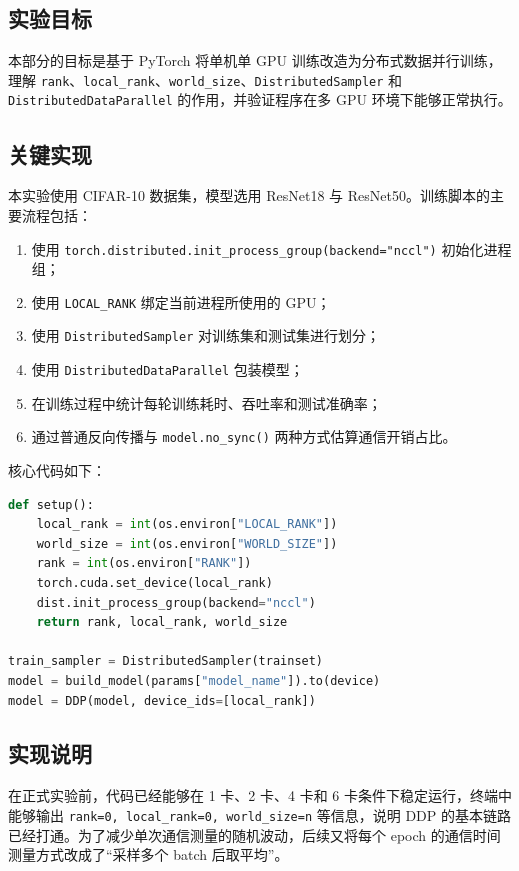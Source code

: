 \documentclass{article}
\begin{document}
\subsection{实验目标}
本部分的目标是基于 PyTorch 将单机单 GPU 训练改造为分布式数据并行训练，理解 \texttt{rank}、\texttt{local\_rank}、\texttt{world\_size}、\texttt{DistributedSampler} 和 \texttt{DistributedDataParallel} 的作用，并验证程序在多 GPU 环境下能够正常执行。

\subsection{关键实现}
本实验使用 CIFAR-10 数据集，模型选用 ResNet18 与 ResNet50。训练脚本的主要流程包括：
\begin{enumerate}
  \item 使用 \texttt{torch.distributed.init\_process\_group(backend="nccl")} 初始化进程组；
  \item 使用 \texttt{LOCAL\_RANK} 绑定当前进程所使用的 GPU；
  \item 使用 \texttt{DistributedSampler} 对训练集和测试集进行划分；
  \item 使用 \texttt{DistributedDataParallel} 包装模型；
  \item 在训练过程中统计每轮训练耗时、吞吐率和测试准确率；
  \item 通过普通反向传播与 \texttt{model.no\_sync()} 两种方式估算通信开销占比。
\end{enumerate}

核心代码如下：
\begin{lstlisting}[language=Python,caption={实验四训练脚本核心流程},label={lst:ddp_core}]
def setup():
    local_rank = int(os.environ["LOCAL_RANK"])
    world_size = int(os.environ["WORLD_SIZE"])
    rank = int(os.environ["RANK"])
    torch.cuda.set_device(local_rank)
    dist.init_process_group(backend="nccl")
    return rank, local_rank, world_size

train_sampler = DistributedSampler(trainset)
model = build_model(params["model_name"]).to(device)
model = DDP(model, device_ids=[local_rank])
\end{lstlisting}

\subsection{实现说明}
在正式实验前，代码已经能够在 1 卡、2 卡、4 卡和 6 卡条件下稳定运行，终端中能够输出 \texttt{rank=0, local\_rank=0, world\_size=n} 等信息，说明 DDP 的基本链路已经打通。为了减少单次通信测量的随机波动，后续又将每个 epoch 的通信时间测量方式改成了“采样多个 batch 后取平均”。
\end{document}
